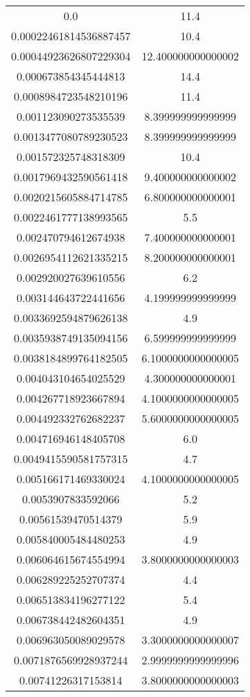 \begin{table}
\begin{tabular}{S[]S[]}
0.0 & 11.4\\
0.00022461814536887457 & 10.4\\
0.00044923626807229304 & 12.400000000000002\\
0.000673854345444813 & 14.4\\
0.0008984723548210196 & 11.4\\
0.001123090273535539 & 8.399999999999999\\
0.0013477080789230523 & 8.399999999999999\\
0.001572325748318309 & 10.4\\
0.0017969432590561418 & 9.400000000000002\\
0.0020215605884714785 & 6.800000000000001\\
0.0022461777138993565 & 5.5\\
0.002470794612674938 & 7.400000000000001\\
0.0026954112621335215 & 8.200000000000001\\
0.002920027639610556 & 6.2\\
0.003144643722441656 & 4.199999999999999\\
0.0033692594879626138 & 4.9\\
0.0035938749135094156 & 6.599999999999999\\
0.0038184899764182505 & 6.1000000000000005\\
0.004043104654025529 & 4.300000000000001\\
0.004267718923667894 & 4.1000000000000005\\
0.004492332762682237 & 5.6000000000000005\\
0.004716946148405708 & 6.0\\
0.0049415590581757315 & 4.7\\
0.005166171469330024 & 4.1000000000000005\\
0.0053907833592066 & 5.2\\
0.00561539470514379 & 5.9\\
0.005840005484480253 & 4.9\\
0.006064615674554994 & 3.8000000000000003\\
0.006289225252707374 & 4.4\\
0.006513834196277122 & 5.4\\
0.006738442482604351 & 4.9\\
0.006963050089029578 & 3.3000000000000007\\
0.0071876569928937244 & 2.9999999999999996\\
0.00741226317153814 & 3.8000000000000003\\

\end{tabular}
\end{table}
